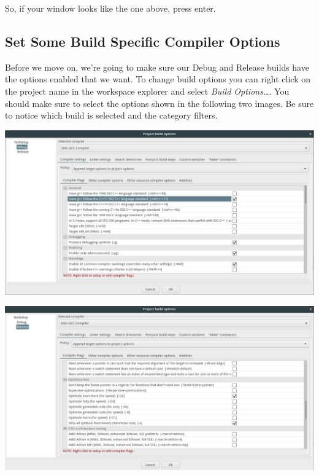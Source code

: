 \documentclass[10pt]{article}
\begin{document}
So, if your window looks like the one above, press enter.

\subsection{Set Some Build Specific Compiler Options}

Before we move on, we're going to make sure our Debug and Release builds have the options enabled that we want. To change build options you can right click on the project name in the workspace explorer and select \textit{Build Options\ldots}. You should make sure to select the options shown in the following two images. Be sure to notice which build is selected and the category filters.

\vspace{.1in}
\begin{center}
\includegraphics[scale=.35]{CB_BasicDebugOpts.png}
\end{center}
\vspace{.1in}

\vspace{.1in}
\begin{center}
\includegraphics[scale=.35]{CB_BasicReleaseOpts.png}
\end{center}
\vspace{.1in}
\end{document}
